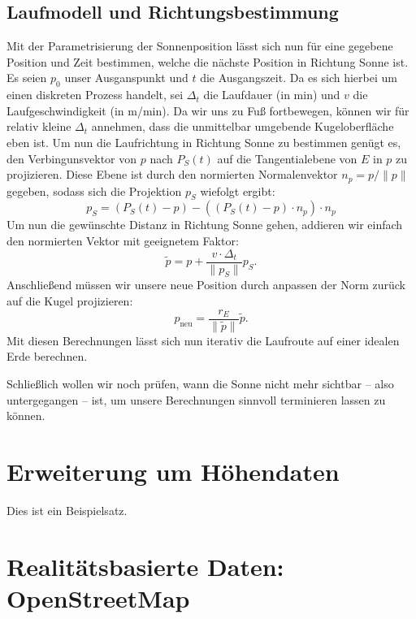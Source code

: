 \documentclass[
    paper=a4,
    DIV14,
    fontsize=12pt,
    pagesize=pdftex,
    toc=bibliographynumbered
]{scrartcl}
\numberwithin{figure}{section}
\numberwithin{equation}{section}
\numberwithin{table}{section}
\begin{document}
\subsection{Laufmodell und Richtungsbestimmung}
Mit der Parametrisierung der Sonnenposition lässt sich nun für eine gegebene Position und
Zeit bestimmen, welche die nächste Position in Richtung Sonne ist. Es seien $p_0$ unser
Ausganspunkt und $t$ die Ausgangszeit. Da es sich hierbei um einen diskreten Prozess
handelt, sei $\Delta_t$ die Laufdauer (in min) und $v$ die Laufgeschwindigkeit (in m/min).
Da wir uns zu Fuß fortbewegen, können wir für relativ kleine $\Delta_t$ annehmen, dass die
unmittelbar umgebende Kugeloberfläche eben ist. Um nun die Laufrichtung in Richtung Sonne
zu bestimmen genügt es, den Verbingunsvektor von $p$ nach $P_S(t)$ auf die Tangentialebene
von $E$ in $p$ zu projizieren. Diese Ebene ist durch den normierten Normalenvektor
$n_p = p/\|p\|$ gegeben, sodass sich die Projektion $p_S$ wiefolgt ergibt:
\begin{equation*}
    p_S = \left( P_S(t) - p \right) - \left( (P_S(t) - p)\cdot n_p \right) \cdot
    n_p
\end{equation*}
Um nun die gewünschte Distanz in Richtung Sonne gehen, addieren wir einfach den normierten
Vektor mit geeignetem Faktor:
\begin{equation*}
    \tilde p = p + \frac{v\cdot\Delta_t}{\|p_S\|} p_S.
\end{equation*}
Anschließend müssen wir unsere neue Position durch anpassen der Norm zurück auf die Kugel
projizieren:
\begin{equation*}
    p_{\text{neu}} = \frac{r_E}{\|\tilde p\|}\tilde p.
\end{equation*}
Mit diesen Berechnungen lässt sich nun iterativ die Laufroute auf einer idealen Erde
berechnen.

Schließlich wollen wir noch prüfen, wann die Sonne nicht mehr sichtbar -- also
untergegangen -- ist, um unsere Berechnungen sinnvoll terminieren lassen zu können.

\section{Erweiterung um Höhendaten}

Dies ist ein Beispielsatz.

\section{Realitätsbasierte Daten: OpenStreetMap}
\end{document}
